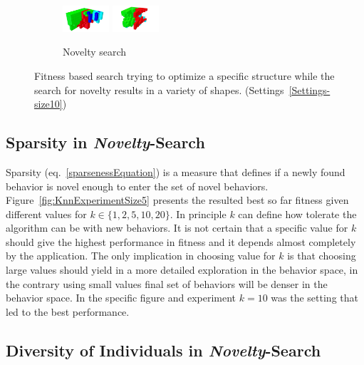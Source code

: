 \begin{figure}[t!]
\begin{subfigure}[b]{1.0\textwidth}
\includegraphics[width=0.19\textwidth]{../Figures/Robots/n_4_g_900.jpg}
\includegraphics[width=0.19\textwidth]{../Figures/Robots/n_4_g_1000.jpg}
\caption{Novelty search}
\end{subfigure}
\caption{Fitness based search trying to optimize a specific structure while the search for novelty results in a variety of shapes. (Settings~\ref{Settings-size10})}
\label{fig:morphologies}
\end{figure}


\subsection{Sparsity in \emph{Novelty}-Search}

Sparsity (eq.~\ref{sparsenessEquation}) is a measure that defines if a newly found behavior is novel enough to enter the set of novel behaviors. Figure~\ref{fig:KnnExperimentSize5} presents the resulted best so far fitness given different values for $k \in \lbrace 1, 2, 5, 10, 20 \rbrace$. In principle $k$ can define how tolerate the algorithm can be with new behaviors. It is not certain that a specific value for $k$ should give the highest performance in fitness and it depends almost completely by the application. The only implication in choosing value for $k$ is that choosing large values should yield in a more detailed exploration in the behavior space, in the contrary using small values final set of behaviors will be denser in the behavior space. In the specific figure and experiment $k=10$ was the setting that led to the best performance.

\subsection{Diversity of Individuals in \emph{Novelty}-Search}

